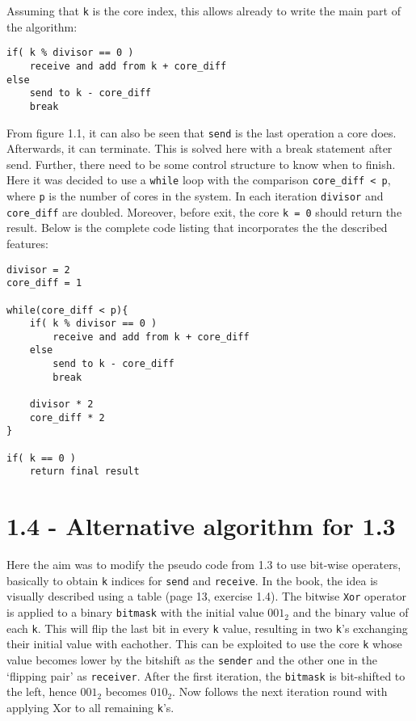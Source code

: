 \documentclass[a4paper,11pt,twoside]{article}
\begin{document}
Assuming that \verb+k+ is the core index, this allows already to write the main part of the algorithm:
\begin{verbatim}
if( k % divisor == 0 )
    receive and add from k + core_diff
else
    send to k - core_diff
    break
\end{verbatim}
From figure 1.1, it can also be seen that \verb+send+ is the last operation a core does. Afterwards, it can terminate. This is solved here with a break statement after send. Further, there need to be some control structure to know when to finish. Here it was decided to use a \verb+while+ loop with the comparison \verb+core_diff < p+, where \verb+p+ is the number of cores in the system. In each iteration \verb+divisor+ and \verb+core_diff+ are doubled. Moreover, before exit, the core \verb+k = 0+ should return the result. Below is the complete code listing that incorporates the the described features:

\begin{verbatim}
divisor = 2
core_diff = 1

while(core_diff < p){
    if( k % divisor == 0 )
        receive and add from k + core_diff
    else 
        send to k - core_diff
        break

    divisor * 2
    core_diff * 2
}

if( k == 0 )
    return final result
\end{verbatim}

\section{1.4 - Alternative algorithm for 1.3}
Here the aim was to modify the pseudo code from 1.3 to use bit-wise operaters, basically to obtain \verb+k+ indices for \verb+send+ and \verb+receive+. In the book, the idea is visually described using a table (page 13, exercise 1.4). The bitwise \verb+Xor+ operator is applied to a binary \verb+bitmask+ with the initial value $001_{2}$ and the binary value of each \verb+k+. This will flip the last bit in every \verb+k+ value, resulting in two \verb+k+'s exchanging their initial value with eachother. This can be exploited to use the core \verb+k+ whose value becomes lower by the bitshift as the \verb+sender+ and the other one in the `flipping pair' as \verb+receiver+. After the first iteration, the \verb+bitmask+ is bit-shifted to the left, hence $001_{2}$ becomes $010_{2}$. Now follows the next iteration round with applying Xor to all remaining \verb+k+'s.      
\end{document}
